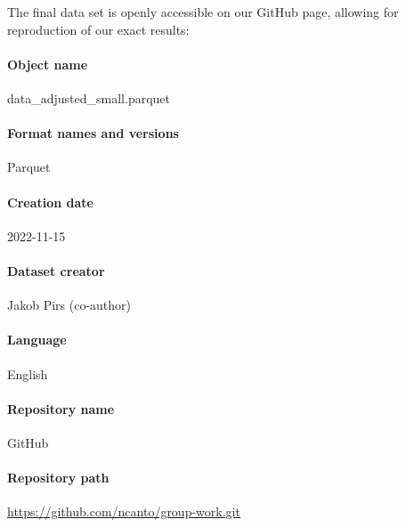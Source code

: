 The final data set is openly accessible on our GitHub page, allowing for reproduction of our exact results:
\paragraph{Object name} data\_adjusted\_small.parquet
\paragraph{Format names and versions} Parquet
\paragraph{Creation date} 2022-11-15
\paragraph{Dataset creator} Jakob Pirs (co-author)
\paragraph{Language} English
\paragraph{Repository name} GitHub 
\paragraph{Repository path} \url{https://github.com/ncanto/group-work.git}




